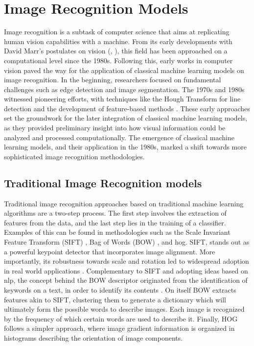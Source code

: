 \section{Image Recognition Models}
\label{rel:sec_imrecon}
Image recognition is a subtask of computer science that aims at replicating human vision 
capabilities with a machine. From its early developments  with David Marr's postulates 
on vision (\cite{poggio1981marr}, \cite{marr2010vision}), this field has been approached on a 
computational level since the 1980s. Following this, early works in computer vision 
paved the way for the application of classical machine learning models on image recognition. In 
the beginning, researchers focused on fundamental challenges such as edge detection and image 
segmentation. The 1970s and 1980s witnessed pioneering efforts, with 
techniques like the Hough Transform for line detection and the development of feature-based 
methods \autocite{duda1972use}. These early approaches set the groundwork for the later integration 
of classical machine learning models, as they provided preliminary insight into how visual 
information could be analyzed and processed computationally. The emergence of classical machine 
learning models, and their application in the 1980s, marked a shift towards more sophisticated 
image recognition methodologies.\\

\subsection{Traditional Image Recognition models}
\noindent Traditional image recognition approaches based on traditional machine learning 
algorithms are a two-step process. The first step involves the extraction of features from the 
data, and the last step lies in the training of a classifier. Examples of this 
can be found in methodologies such as the Scale Invariant Feature Transform (SIFT) 
\autocite{lowe1999object}, Bag of Words (BOW) \autocite{csurka2004visual}, and \gls{hog}. 
SIFT, stands out as a powerful keypoint detector that incorporates image alignment. 
More importantly, its robustness towards scale and rotation led to widespread adoption in real 
world applications \autocite{cruz2012scale}.
Complementary to SIFT and adopting ideas based on \gls{nlp}, the concept behind the BOW descriptor 
originated from the identification of keywords on a text, in order to identify its contents 
\autocite{harris1954distributional}. On itself BOW extracts features akin to SIFT, clustering them 
to generate a dictionary which will ultimately form the possible words to describe images. Each 
image is recognized by the frequency of which certain words are used to describe it.
Finally, HOG follows a simpler approach, where image gradient information is organized in histograms 
describing the orientation of image components. \\ 

